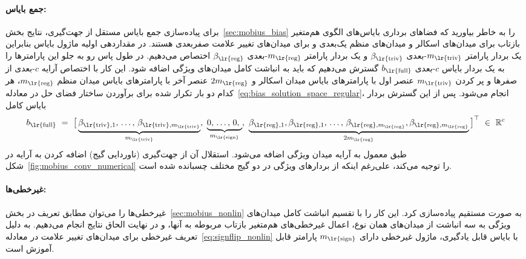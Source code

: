 \paragraph{جمع بایاس:}
برای پیاده‌سازی جمع بایاس مستقل از جهت‌گیری، نتایج بخش~\ref{sec:mobius_bias} را به خاطر بیاورید که فضاهای برداری بایاس‌های الگوی هم‌متغیر بازتاب برای میدان‌های اسکالر و میدان‌های منظم یک‌بعدی و برای میدان‌های تغییر علامت صفربعدی هستند.
در مقداردهی اولیه ماژول بایاس بنابراین یک بردار پارامتر $m_{\textup{\lr{triv}}}$-بعدی $\beta_{\textup{\lr{triv}}}$ و یک بردار پارامتر $m_{\textup{\lr{reg}}}$-بعدی $\beta_{\textup{\lr{reg}}}$ اختصاص می‌دهیم.
در طول پاس رو به جلو این پارامترها را به یک بردار بایاس $c$-بعدی $b_{\textup{\lr{full}}}$ گسترش می‌دهیم که باید به انباشت کامل میدان‌های ویژگی اضافه شود.
این کار با اختصاص آرایه $c$-بعدی از صفرها و پر کردن $m_{\textup{\lr{triv}}}$ عنصر اول با پارامترهای بایاس میدان اسکالر و $2m_{\textup{\lr{reg}}}$ عنصر آخر با پارامترهای بایاس میدان منظم $m_{\textup{\lr{reg}}}$، هر کدام دو بار تکرار شده برای برآوردن ساختار فضای حل در معادله~\eqref{eq:bias_solution_space_regular}، انجام می‌شود.
پس از این گسترش بردار بایاس کامل
\begin{align}
	b_{\textup{\lr{full}}}\ =\ \big[
	\underbrace{
		\beta_{\textup{\lr{triv}},1}, \,\dots,\, \beta_{\textup{\lr{triv}}, m_{\textup{\lr{triv}}}}
	}_{m_{\textup{\lr{triv}}}},\ 
	\underbrace{
		0, \,\dots,\, 0,\ 
	}_{m_{\textup{\lr{sign}}}},\ 
	\underbrace{
		\beta_{\textup{\lr{reg}},1},\beta_{\textup{\lr{reg}},1}, \,\dots,\, \beta_{\textup{\lr{reg}}, m_{\textup{\lr{reg}}}}, \beta_{\textup{\lr{reg}}, m_{\textup{\lr{reg}}}}
	}_{2m_{\textup{\lr{reg}}}}
	\big]^\top \ \in\ \R^c
\end{align}
طبق معمول به آرایه میدان ویژگی اضافه می‌شود.
استقلال آن از جهت‌گیری (ناوردایی گیج) اضافه کردن به آرایه در شکل~\ref{fig:mobius_conv_numerical} را توجیه می‌کند، علی‌رغم اینکه از بردارهای ویژگی در دو گیج مختلف چسبانده شده است.



\paragraph{غیرخطی‌ها:}
غیرخطی‌ها را می‌توان مطابق تعریف در بخش~\ref{sec:mobius_nonlin} به صورت مستقیم پیاده‌سازی کرد.
این کار را با تقسیم انباشت کامل میدان‌های ویژگی به سه انباشت از میدان‌های همان نوع، اعمال غیرخطی‌های هم‌متغیر بازتاب مربوطه به آنها، و در نهایت الحاق نتایج انجام می‌دهیم.
به دلیل تعریف غیرخطی برای میدان‌های تغییر علامت در معادله~\eqref{eq:signflip_nonlin} با بایاس قابل یادگیری، ماژول غیرخطی دارای $m_{\textup{\lr{sign}}}$ پارامتر قابل آموزش است.




